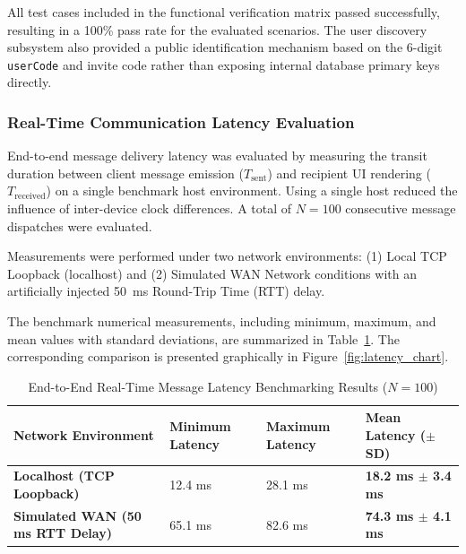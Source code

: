 \documentclass[12pt, a4paper]{article}
\begin{document}
All test cases included in the functional verification matrix passed successfully, resulting in a 100\% pass rate for the evaluated scenarios. The user discovery subsystem also provided a public identification mechanism based on the 6-digit \texttt{userCode} and invite code rather than exposing internal database primary keys directly.

\subsubsection{Real-Time Communication Latency Evaluation}

End-to-end message delivery latency was evaluated by measuring the transit duration between client message emission ($T_{\text{sent}}$) and recipient UI rendering ($T_{\text{received}}$) on a single benchmark host environment. Using a single host reduced the influence of inter-device clock differences. A total of $N = 100$ consecutive message dispatches were evaluated.

Measurements were performed under two network environments: (1) Local TCP Loopback (localhost) and (2) Simulated WAN Network conditions with an artificially injected 50~ms Round-Trip Time (RTT) delay.

The benchmark numerical measurements, including minimum, maximum, and mean values with standard deviations, are summarized in Table~\ref{tab:latency_results}. The corresponding comparison is presented graphically in Figure~\ref{fig:latency_chart}.

\begin{table}[htbp]
\centering
\caption{End-to-End Real-Time Message Latency Benchmarking Results ($N = 100$)}
\label{tab:latency_results}

\begin{tabular}{p{5.0cm} p{2.7cm} p{2.7cm} p{3.5cm}}
\toprule
\textbf{Network Environment} &
\textbf{Minimum Latency} &
\textbf{Maximum Latency} &
\textbf{Mean Latency ($\pm$ SD)} \\
\midrule

\textbf{Localhost (TCP Loopback)} &
12.4 ms &
28.1 ms &
\textbf{18.2 ms $\pm$ 3.4 ms} \\

\textbf{Simulated WAN (50 ms RTT Delay)} &
65.1 ms &
82.6 ms &
\textbf{74.3 ms $\pm$ 4.1 ms} \\

\bottomrule
\end{tabular}
\end{table}
\end{document}
